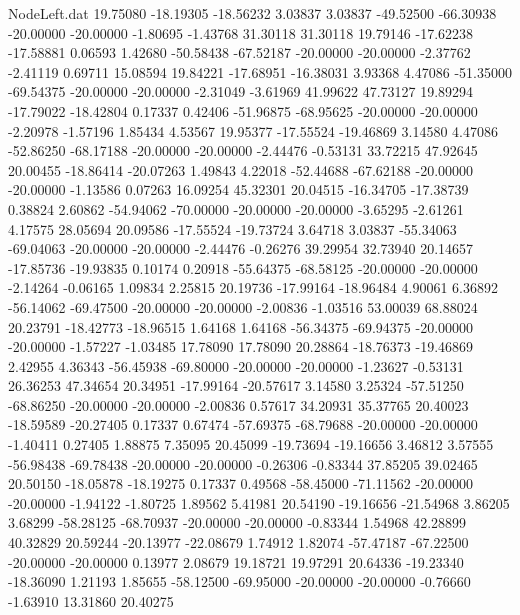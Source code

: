 \begin{filecontents}{NodeLeft.dat}
  19.75080  -18.19305  -18.56232     3.03837    3.03837  -49.52500  -66.30938  -20.00000  -20.00000   -1.80695   -1.43768   31.30118   31.30118
  19.79146  -17.62238  -17.58881     0.06593    1.42680  -50.58438  -67.52187  -20.00000  -20.00000   -2.37762   -2.41119    0.69711   15.08594
  19.84221  -17.68951  -16.38031     3.93368    4.47086  -51.35000  -69.54375  -20.00000  -20.00000   -2.31049   -3.61969   41.99622   47.73127
  19.89294  -17.79022  -18.42804     0.17337    0.42406  -51.96875  -68.95625  -20.00000  -20.00000   -2.20978   -1.57196    1.85434    4.53567
  19.95377  -17.55524  -19.46869     3.14580    4.47086  -52.86250  -68.17188  -20.00000  -20.00000   -2.44476   -0.53131   33.72215   47.92645
  20.00455  -18.86414  -20.07263     1.49843    4.22018  -52.44688  -67.62188  -20.00000  -20.00000   -1.13586    0.07263   16.09254   45.32301
  20.04515  -16.34705  -17.38739     0.38824    2.60862  -54.94062  -70.00000  -20.00000  -20.00000   -3.65295   -2.61261    4.17575   28.05694
  20.09586  -17.55524  -19.73724     3.64718    3.03837  -55.34063  -69.04063  -20.00000  -20.00000   -2.44476   -0.26276   39.29954   32.73940
  20.14657  -17.85736  -19.93835     0.10174    0.20918  -55.64375  -68.58125  -20.00000  -20.00000   -2.14264   -0.06165    1.09834    2.25815
  20.19736  -17.99164  -18.96484     4.90061    6.36892  -56.14062  -69.47500  -20.00000  -20.00000   -2.00836   -1.03516   53.00039   68.88024
  20.23791  -18.42773  -18.96515     1.64168    1.64168  -56.34375  -69.94375  -20.00000  -20.00000   -1.57227   -1.03485   17.78090   17.78090
  20.28864  -18.76373  -19.46869     2.42955    4.36343  -56.45938  -69.80000  -20.00000  -20.00000   -1.23627   -0.53131   26.36253   47.34654
  20.34951  -17.99164  -20.57617     3.14580    3.25324  -57.51250  -68.86250  -20.00000  -20.00000   -2.00836    0.57617   34.20931   35.37765
  20.40023  -18.59589  -20.27405     0.17337    0.67474  -57.69375  -68.79688  -20.00000  -20.00000   -1.40411    0.27405    1.88875    7.35095
  20.45099  -19.73694  -19.16656     3.46812    3.57555  -56.98438  -69.78438  -20.00000  -20.00000   -0.26306   -0.83344   37.85205   39.02465
  20.50150  -18.05878  -18.19275     0.17337    0.49568  -58.45000  -71.11562  -20.00000  -20.00000   -1.94122   -1.80725    1.89562    5.41981
  20.54190  -19.16656  -21.54968     3.86205    3.68299  -58.28125  -68.70937  -20.00000  -20.00000   -0.83344    1.54968   42.28899   40.32829
  20.59244  -20.13977  -22.08679     1.74912    1.82074  -57.47187  -67.22500  -20.00000  -20.00000    0.13977    2.08679   19.18721   19.97291
  20.64336  -19.23340  -18.36090     1.21193    1.85655  -58.12500  -69.95000  -20.00000  -20.00000   -0.76660   -1.63910   13.31860   20.40275

\end{filecontents}
